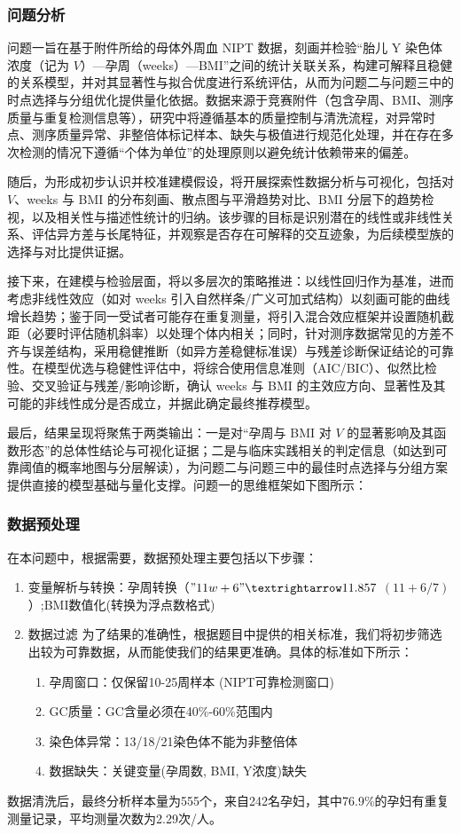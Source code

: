 \documentclass[withoutpreface]{cumcmthesis}
\begin{document}
\subsubsection{问题分析}

问题一旨在基于附件所给的母体外周血 NIPT 数据，刻画并检验“胎儿 Y 染色体浓度（记为 $V$）—孕周（weeks）—BMI”之间的统计关联关系，构建可解释且稳健的关系模型，并对其显著性与拟合优度进行系统评估，从而为问题二与问题三中的时点选择与分组优化提供量化依据。数据来源于竞赛附件（包含孕周、BMI、测序质量与重复检测信息等），研究中将遵循基本的质量控制与清洗流程，对异常时点、测序质量异常、非整倍体标记样本、缺失与极值进行规范化处理，并在存在多次检测的情况下遵循“个体为单位”的处理原则以避免统计依赖带来的偏差。

随后，为形成初步认识并校准建模假设，将开展探索性数据分析与可视化，包括对 $V$、weeks 与 BMI 的分布刻画、散点图与平滑趋势对比、BMI 分层下的趋势检视，以及相关性与描述性统计的归纳。该步骤的目标是识别潜在的线性或非线性关系、评估异方差与长尾特征，并观察是否存在可解释的交互迹象，为后续模型族的选择与对比提供证据。

接下来，在建模与检验层面，将以多层次的策略推进：以线性回归作为基准，进而考虑非线性效应（如对 weeks 引入自然样条/广义可加式结构）以刻画可能的曲线增长趋势；鉴于同一受试者可能存在重复测量，将引入混合效应框架并设置随机截距（必要时评估随机斜率）以处理个体内相关；同时，针对测序数据常见的方差不齐与误差结构，采用稳健推断（如异方差稳健标准误）与残差诊断保证结论的可靠性。在模型优选与稳健性评估中，将综合使用信息准则（AIC/BIC）、似然比检验、交叉验证与残差/影响诊断，确认 weeks 与 BMI 的主效应方向、显著性及其可能的非线性成分是否成立，并据此确定最终推荐模型。

最后，结果呈现将聚焦于两类输出：一是对“孕周与 BMI 对 $V$ 的显著影响及其函数形态”的总体性结论与可视化证据；二是与临床实践相关的判定信息（如达到可靠阈值的概率地图与分层解读），为问题二与问题三中的最佳时点选择与分组方案提供直接的模型基础与量化支撑。问题一的思维框架如下图所示：

\subsubsection{数据预处理}
在本问题中，根据需要，数据预处理主要包括以下步骤：
\begin{enumerate}
    \item 变量解析与转换：孕周转换（$"11w+6" → 11.857$ $(11 + 6/7)$）;BMI数值化(转换为浮点数格式)
    \item 数据过滤
为了结果的准确性，根据题目中提供的相关标准，我们将初步筛选出较为可靠数据，从而能使我们的结果更准确。具体的标准如下所示：
\begin{enumerate}
    \item 孕周窗口：仅保留10-25周样本 (NIPT可靠检测窗口)
    \item GC质量：GC含量必须在40\%-60\%范围内
    \item 染色体异常：13/18/21染色体不能为非整倍体
    \item 数据缺失：关键变量(孕周数, BMI, Y浓度)缺失
\end{enumerate}
\end{enumerate}
数据清洗后，最终分析样本量为555个，来自242名孕妇，其中76.9\%的孕妇有重复测量记录，平均测量次数为2.29次/人。
\end{document}
